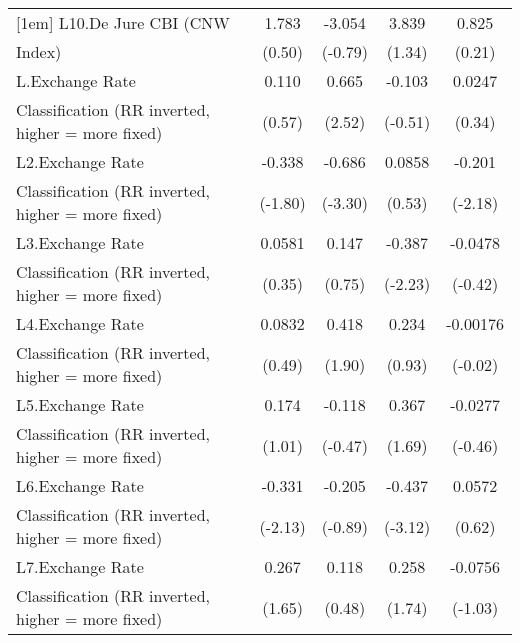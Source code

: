 {\begin{tabular}{l*{4}{c}}
[1em]
L10.De Jure CBI (CNW&       1.783         &      -3.054         &       3.839         &       0.825         \\
Index)              &      (0.50)         &     (-0.79)         &      (1.34)         &      (0.21)         \\
[1em]
L.Exchange Rate     &       0.110         &       0.665\sym{*}  &      -0.103         &      0.0247         \\
Classification (RR inverted, higher = more fixed)&      (0.57)         &      (2.52)         &     (-0.51)         &      (0.34)         \\
[1em]
L2.Exchange Rate    &      -0.338         &      -0.686\sym{***}&      0.0858         &      -0.201\sym{*}  \\
Classification (RR inverted, higher = more fixed)&     (-1.80)         &     (-3.30)         &      (0.53)         &     (-2.18)         \\
[1em]
L3.Exchange Rate    &      0.0581         &       0.147         &      -0.387\sym{*}  &     -0.0478         \\
Classification (RR inverted, higher = more fixed)&      (0.35)         &      (0.75)         &     (-2.23)         &     (-0.42)         \\
[1em]
L4.Exchange Rate    &      0.0832         &       0.418         &       0.234         &    -0.00176         \\
Classification (RR inverted, higher = more fixed)&      (0.49)         &      (1.90)         &      (0.93)         &     (-0.02)         \\
[1em]
L5.Exchange Rate    &       0.174         &      -0.118         &       0.367         &     -0.0277         \\
Classification (RR inverted, higher = more fixed)&      (1.01)         &     (-0.47)         &      (1.69)         &     (-0.46)         \\
[1em]
L6.Exchange Rate    &      -0.331\sym{*}  &      -0.205         &      -0.437\sym{**} &      0.0572         \\
Classification (RR inverted, higher = more fixed)&     (-2.13)         &     (-0.89)         &     (-3.12)         &      (0.62)         \\
[1em]
L7.Exchange Rate    &       0.267         &       0.118         &       0.258         &     -0.0756         \\
Classification (RR inverted, higher = more fixed)&      (1.65)         &      (0.48)         &      (1.74)         &     (-1.03)         \\

\end{tabular}}
